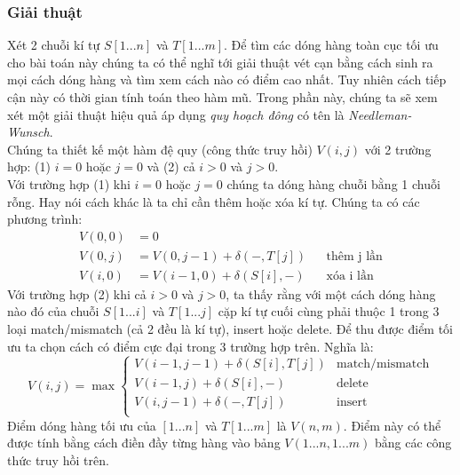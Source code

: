 \subsubsection{Giải thuật}
Xét 2 chuỗi kí tự $S[1...n]$ và $T[1...m]$. Để tìm các dóng hàng toàn cục tối ưu cho 
bài toán này chúng ta có thể nghĩ tới giải thuật vét cạn bằng cách sinh ra mọi cách 
dóng hàng và tìm xem cách nào có điểm cao nhất. Tuy nhiên cách tiếp cận này có thời
gian tính toán theo hàm mũ. Trong phần này, chúng ta sẽ xem xét một giải thuật hiệu quả
áp dụng \textit{quy hoạch đông} có tên là \textit{Needleman-Wunsch}. \\
Chúng ta thiết kế một hàm đệ quy (công thức truy hồi) $V(i,j)$ với 2 trường hợp: (1) $i = 0$ 
hoặc $j = 0$ và (2) cả $i > 0$ và $j > 0$. \\
Với trường hợp (1) khi $i = 0$ hoặc $j = 0$ chúng ta dóng hàng chuỗi bằng 1 chuỗi rỗng.
Hay nói cách khác là ta chỉ cần thêm hoặc xóa kí tự. Chúng ta có các phương trình:
\begin{equation}
    \begin{aligned}
        V(0, 0) &= 0 & \\
        V(0, j) &= V(0, j - 1) + \delta(-, T[j]) && \text{thêm j lần} \\
        V(i, 0) &= V(i -1, 0) + \delta(S[i], -) && \text{xóa i lần} 
    \end{aligned}
\end{equation}
Với trường hợp (2) khi cả $i > 0$ và $j > 0$, ta thấy rằng với một cách dóng hàng nào đó
của chuỗi $S[1...i]$ và $T[1...j]$ cặp kí tự cuối cùng phải thuộc 1 trong 3 loại 
match/mismatch (cả 2 đều là kí tự), insert hoặc delete. Để thu được điểm tối ưu ta chọn 
cách có điểm cực đại trong 3 trường hợp trên. Nghĩa là:
\begin{equation}
    V(i, j) = \max 
    \begin{cases}
        V(i - 1, j - 1) + \delta(S[i], T[j]) & \text{match/mismatch} \\
        V(i - 1, j) + \delta(S[i], -) & \text{delete} \\
        V(i, j - 1) + \delta(-, T[j]) & \text{insert} \\
    \end{cases}
\end{equation}
Điểm dóng hàng tối ưu của $[1...n]$ và $T[1...m]$ là $V(n,m)$. Điểm này có thể được tính bằng
cách điền đầy từng hàng vào bảng $V(1...n, 1...m)$ bằng các công thức truy hồi trên.

